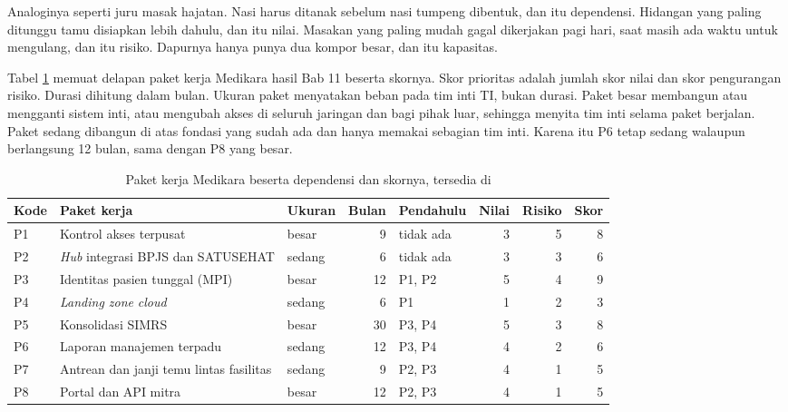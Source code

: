 Analoginya seperti juru masak hajatan. Nasi harus ditanak sebelum nasi tumpeng
dibentuk, dan itu dependensi. Hidangan yang paling ditunggu tamu disiapkan
lebih dahulu, dan itu nilai. Masakan yang paling mudah gagal dikerjakan pagi
hari, saat masih ada waktu untuk mengulang, dan itu risiko. Dapurnya hanya
punya dua kompor besar, dan itu kapasitas.

Tabel \ref{tab:ch12-paket} memuat delapan paket kerja Medikara hasil Bab 11
beserta skornya. Skor prioritas adalah jumlah skor nilai dan skor pengurangan
risiko. Durasi dihitung dalam bulan. Ukuran paket menyatakan beban pada tim
inti TI, bukan durasi. Paket besar membangun atau mengganti sistem inti, atau
mengubah akses di seluruh jaringan dan bagi pihak luar, sehingga menyita tim
inti selama paket berjalan. Paket sedang dibangun di atas fondasi yang sudah
ada dan hanya memakai sebagian tim inti. Karena itu P6 tetap sedang walaupun
berlangsung 12 bulan, sama dengan P8 yang besar.

\begin{table}[!htb]
  \centering
  \caption{Paket kerja Medikara beserta dependensi dan skornya, tersedia di
           }
  \label{tab:ch12-paket}
  \begin{tabularx}{\textwidth}{l>{\raggedright\arraybackslash}Xlrlrrr}
    \hline
    \textbf{Kode} & \textbf{Paket kerja} & \textbf{Ukuran} & \textbf{Bulan} &
      \textbf{Pendahulu} & \textbf{Nilai} & \textbf{Risiko} & \textbf{Skor} \\
    \hline
    P1 & Kontrol akses terpusat & besar & 9 & tidak ada & 3 & 5 & 8 \\
    \hline
    P2 & \textit{Hub} integrasi BPJS dan SATUSEHAT & sedang & 6 & tidak ada & 3 & 3 & 6 \\
    \hline
    P3 & Identitas pasien tunggal (MPI) & besar & 12 & P1, P2 & 5 & 4 & 9 \\
    \hline
    P4 & \textit{Landing zone} \textit{cloud} & sedang & 6 & P1 & 1 & 2 & 3 \\
    \hline
    P5 & Konsolidasi SIMRS & besar & 30 & P3, P4 & 5 & 3 & 8 \\
    \hline
    P6 & Laporan manajemen terpadu & sedang & 12 & P3, P4 & 4 & 2 & 6 \\
    \hline
    P7 & Antrean dan janji temu lintas fasilitas & sedang & 9 & P2, P3 & 4 & 1 & 5 \\
    \hline
    P8 & Portal dan API mitra & besar & 12 & P2, P3 & 4 & 1 & 5 \\
    \hline
  \end{tabularx}
\end{table}

